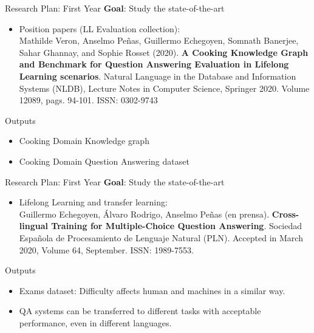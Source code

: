\documentclass{beamer}
\begin{document}
\begin{frame}{Research Plan: First Year}
  \vspace{-0.2cm}
  \alert{\textbf{Goal}}: Study the state-of-the-art
  \vspace{0.1cm}
  \begin{itemize}
    \item Position papers (LL Evaluation collection): \\
      {\small Mathilde Veron, Anselmo Peñas, Guillermo Echegoyen, Somnath Banerjee, Sahar Ghannay, and Sophie Rosset (2020). \textbf{A Cooking Knowledge Graph and Benchmark for Question Answering Evaluation in Lifelong Learning scenarios}. Natural Language in the Database and Information Systems (NLDB), Lecture Notes in Computer Science, Springer 2020. Volume 12089, pags. 94-101. ISSN: 0302-9743 \cite{veron_nldb_2020}}
  \end{itemize}
  \begin{block}{Outputs}
    \begin{itemize}
      \item Cooking Domain Knowledge graph
      \item Cooking Domain Question Answering dataset
    \end{itemize}
  \end{block}
\end{frame}

\begin{frame}{Research Plan: First Year}
  \vspace{-0.2cm}
  \alert{\textbf{Goal}}: Study the state-of-the-art
  \vspace{0.1cm}
  \begin{itemize}
    \item Lifelong Learning and transfer learning: \\
      {\small Guillermo Echegoyen, Álvaro Rodrigo, Anselmo Peñas (en prensa). \textbf{Cross-lingual Training for Multiple-Choice Question Answering}. Sociedad Española de Procesamiento de Lenguaje Natural (PLN). Accepted in March 2020, Volume 64, September. ISSN: 1989-7553. \cite{echegoyen_sepln_2020}}
  \end{itemize}
  \begin{block}{Outputs}
    \begin{itemize}
      \item Exams dataset: Difficulty affects human and machines in a similar way.
      \item QA systems can be transferred to different tasks with acceptable performance, even in different languages.
    \end{itemize}
  \end{block}
\end{frame}
\end{document}
